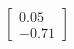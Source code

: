 \documentclass[preview]{standalone}
\begin{document}
\begin{align*}
\begin{bmatrix} 0.05 \\ -0.71 \end{bmatrix}
\end{align*}
\end{document}
